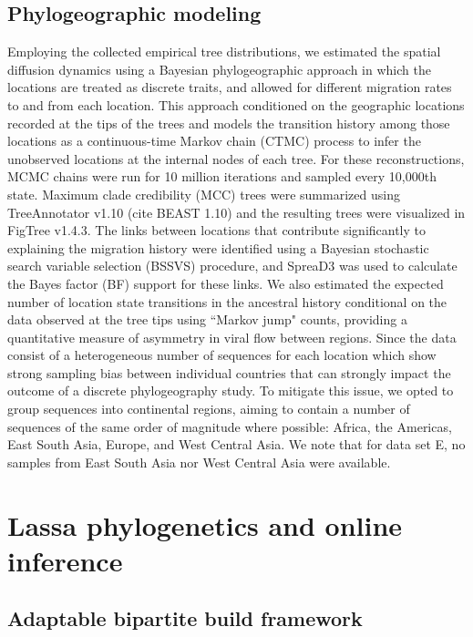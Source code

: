 \subsection{Phylogeographic modeling}

Employing the collected empirical tree distributions, we estimated the spatial diffusion dynamics using a Bayesian phylogeographic approach in which the locations are treated as discrete traits, and allowed for different migration rates to and from each location.
This approach conditioned on the geographic locations recorded at the tips of the trees and models the transition history among those locations as a continuous-time Markov chain (CTMC) process to infer the unobserved locations at the internal nodes of each tree.
For these reconstructions, MCMC chains were run for 10 million iterations and sampled every 10,000th state.
Maximum clade credibility (MCC) trees were summarized using TreeAnnotator v1.10 (cite BEAST 1.10) and the resulting trees were visualized in FigTree v1.4.3.
The links between locations that contribute significantly to explaining the migration history were identified using a Bayesian stochastic search variable selection (BSSVS) procedure, and SpreaD3 %
was used to calculate the Bayes factor (BF) support for these links.
We also estimated the expected number of location state transitions in the ancestral history conditional on the data observed at the tree tips using ``Markov jump" counts, providing a quantitative measure of asymmetry in viral flow between regions.
Since the data consist of a heterogeneous number of sequences for each location which show strong sampling bias between individual countries that can strongly impact the outcome of a discrete phylogeography study.
To mitigate this issue, we opted to group sequences into continental regions, aiming to contain a number of sequences of the same order of magnitude where possible: Africa, the Americas, East South Asia, Europe, and West Central Asia. %
We note that for data set E, no samples from East South Asia nor West Central Asia were available.


\section{Lassa phylogenetics and online inference}

\subsection{Adaptable bipartite build framework}

